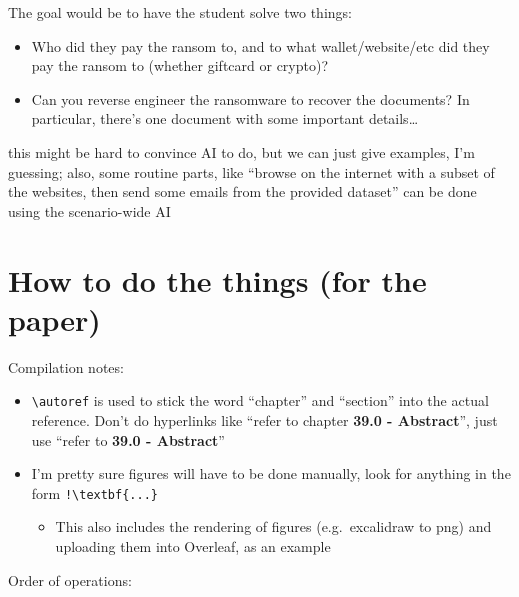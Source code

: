 The goal would be to have the student solve two things:

\begin{itemize}
\tightlist
\item
  Who did they pay the ransom to, and to what wallet/website/etc did
  they pay the ransom to (whether giftcard or crypto)?
\item
  Can you reverse engineer the ransomware to recover the documents? In
  particular, there's one document with some important details\ldots{}
\end{itemize}

this might be hard to convince AI to do, but we can just give examples,
I'm guessing; also, some routine parts, like ``browse on the internet
with a subset of the websites, then send some emails from the provided
dataset'' can be done using the scenario-wide AI

\section{How to do the things (for the
paper)}\label{how-to-do-the-things-for-the-paper}

Compilation notes:

\begin{itemize}
\tightlist
\item
  \passthrough{\lstinline!\\autoref!} is used to stick the word
  ``chapter'' and ``section'' into the actual reference. Don't do
  hyperlinks like ``refer to chapter \textbf{39.0 - Abstract}'', just
  use ``refer to \textbf{39.0 - Abstract}''
\item
  I'm pretty sure figures will have to be done manually, look for
  anything in the form \passthrough{\lstinline"!\\textbf\{...\}"}

  \begin{itemize}
  \tightlist
  \item
    This also includes the rendering of figures (e.g.~excalidraw to png)
    and uploading them into Overleaf, as an example
  \end{itemize}
\end{itemize}

Order of operations:

